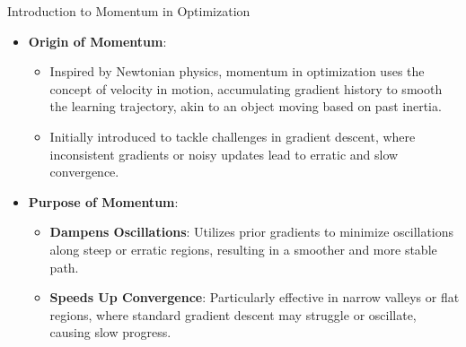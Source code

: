 \documentclass[serif, aspectratio=169]{beamer}
\begin{document}
\begin{frame}{Introduction to Momentum in Optimization}
    \begin{itemize}
        \item \textbf{Origin of Momentum}: 
        \begin{itemize}
            \item Inspired by Newtonian physics, momentum in optimization uses the concept of velocity in motion, accumulating gradient history to smooth the learning trajectory, akin to an object moving based on past inertia.
            \item Initially introduced to tackle challenges in gradient descent, where inconsistent gradients or noisy updates lead to erratic and slow convergence.
        \end{itemize}
        
        \item \textbf{Purpose of Momentum}: 
        \begin{itemize}
            \item \textbf{Dampens Oscillations}: Utilizes prior gradients to minimize oscillations along steep or erratic regions, resulting in a smoother and more stable path.
            \item \textbf{Speeds Up Convergence}: Particularly effective in narrow valleys or flat regions, where standard gradient descent may struggle or oscillate, causing slow progress.
        \end{itemize}
        
    \end{itemize}
\end{frame}

\end{document}

